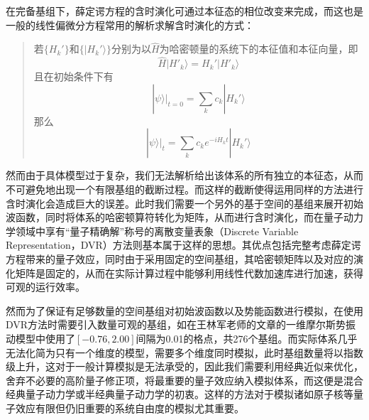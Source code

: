 在完备基组下，薛定谔方程的含时演化可通过本征态的相位改变来完成，而这也是一般的线性偏微分方程常用的解析求解含时演化的方式\cite{courant2008methods}：

\begin{quote}
若$\{H_k'\}$和$\{|H_k'\rangle\}$分别为以$\hat{H}$为哈密顿量的系统下的本征值和本征向量，即
\begin{equation}
	\hat{H} |H'_k\rangle = H_k' |H'_k\rangle
\end{equation}
且在初始条件下有
\begin{equation}
	|\psi \rangle\big|_{t=0} = \sum_k c_k |H_k'\rangle
\end{equation}
那么
\begin{equation}
	|\psi \rangle\big|_{t} = \sum_k c_k e^{-iH_k t}|H_k'\rangle
\end{equation}
\end{quote}

然而由于具体模型过于复杂，我们无法解析给出该体系的所有独立的本征态，从而不可避免地出现一个有限基组的截断过程。而这样的截断使得运用同样的方法进行含时演化会造成巨大的误差。此时我们需要一个另外的基于空间的基组来展开初始波函数，同时将体系的哈密顿算符转化为矩阵，从而进行含时演化，而在量子动力学领域中享有``量子精确解''称号的离散变量表象（Discrete Variable Representation，DVR）方法则基本属于这样的思想\cite{colbert1992novel}。其优点包括完整考虑薛定谔方程带来的量子效应，同时由于采用固定的空间基组，其哈密顿矩阵以及对应的演化矩阵是固定的，从而在实际计算过程中能够利用线性代数加速库进行加速，获得可观的运行效率。

然而为了保证有足够数量的空间基组对初始波函数以及势能函数进行模拟，在使用DVR方法时需要引入数量可观的基组，如在王林军老师的文章\cite{LinjunSemiclassical}的一维摩尔斯势振动模型中使用了$[-0.76,2.00]$间隔为0.01的格点，共276个基组。而实际体系几乎无法化简为只有一个维度的模型，需要多个维度同时模拟，此时基组数量将以指数级上升，这对于一般计算模拟是无法承受的，因此我们需要利用经典近似来优化，舍弃不必要的高阶量子修正项，将最重要的量子效应纳入模拟体系，而这便是混合经典量子动力学或半经典量子动力学的初衷。这样的方法对于模拟诸如原子核等量子效应有限但仍旧重要的系统自由度的模拟尤其重要。

